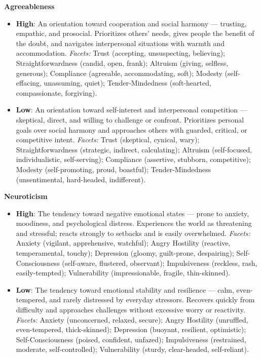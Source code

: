 \textbf{Agreeableness}
\begin{itemize}
  \item \textbf{High}: An orientation toward cooperation and social harmony --- trusting, empathic, and prosocial. Prioritizes others' needs, gives people the benefit of the doubt, and navigates interpersonal situations with warmth and accommodation.
    \emph{Facets:} Trust (accepting, unsuspecting, believing); Straightforwardness (candid, open, frank); Altruism (giving, selfless, generous); Compliance (agreeable, accommodating, soft); Modesty (self-effacing, unassuming, quiet); Tender-Mindedness (soft-hearted, compassionate, forgiving).
  \item \textbf{Low}: An orientation toward self-interest and interpersonal competition --- skeptical, direct, and willing to challenge or confront. Prioritizes personal goals over social harmony and approaches others with guarded, critical, or competitive intent.
    \emph{Facets:} Trust (skeptical, cynical, wary); Straightforwardness (strategic, indirect, calculating); Altruism (self-focused, individualistic, self-serving); Compliance (assertive, stubborn, competitive); Modesty (self-promoting, proud, boastful); Tender-Mindedness (unsentimental, hard-headed, indifferent).
\end{itemize}

\textbf{Neuroticism}
\begin{itemize}
  \item \textbf{High}: The tendency toward negative emotional states --- prone to anxiety, moodiness, and psychological distress. Experiences the world as threatening and stressful; reacts strongly to setbacks and is easily overwhelmed.
    \emph{Facets:} Anxiety (vigilant, apprehensive, watchful); Angry Hostility (reactive, temperamental, touchy); Depression (gloomy, guilt-prone, despairing); Self-Consciousness (self-aware, flustered, observant); Impulsiveness (reckless, rash, easily-tempted); Vulnerability (impressionable, fragile, thin-skinned).
  \item \textbf{Low}: The tendency toward emotional stability and resilience --- calm, even-tempered, and rarely distressed by everyday stressors. Recovers quickly from difficulty and approaches challenges without excessive worry or reactivity.
    \emph{Facets:} Anxiety (unconcerned, relaxed, secure); Angry Hostility (unruffled, even-tempered, thick-skinned); Depression (buoyant, resilient, optimistic); Self-Consciousness (poised, confident, unfazed); Impulsiveness (restrained, moderate, self-controlled); Vulnerability (sturdy, clear-headed, self-reliant).
\end{itemize}

